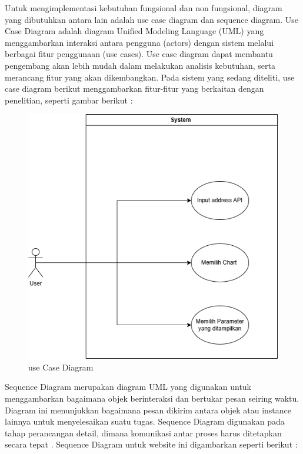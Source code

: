 Untuk mengimplementasi kebutuhan fungsional dan non fungsional, diagram yang dibutuhkan antara lain adalah use case diagram dan sequence diagram. Use Case Diagram adalah diagram Unified Modeling Language (UML) yang menggambarkan interaksi antara pengguna (actors) dengan sistem melalui berbagai fitur penggunaan (use cases). Use case diagram dapat membantu pengembang akan lebih mudah dalam melakukan analisis kebutuhan, serta merancang fitur yang akan dikembangkan. Pada sistem yang sedang diteliti, use case diagram berikut menggambarkan fitur-fitur yang berkaitan dengan penelitian, seperti gambar berikut :

\begin{figure}[H]
	\centering
	\includegraphics[width=0.8\linewidth]{gambar/Metodologi/Use Case.png}
	\caption{use Case Diagram}
	\label{Use Case Diagram}
\end{figure}

Sequence Diagram merupakan diagram UML yang digunakan untuk menggambarkan bagaimana objek berinteraksi dan bertukar pesan seiring waktu. Diagram ini menunjukkan bagaimana pesan dikirim antara objek atau instance lainnya untuk menyelesaikan suatu tugas. Sequence Diagram digunakan pada tahap perancangan detail, dimana komunikasi antar proses harus ditetapkan secara tepat \cite{Fedaghi}.  Sequence Diagram untuk website ini digambarkan seperti berikut :

